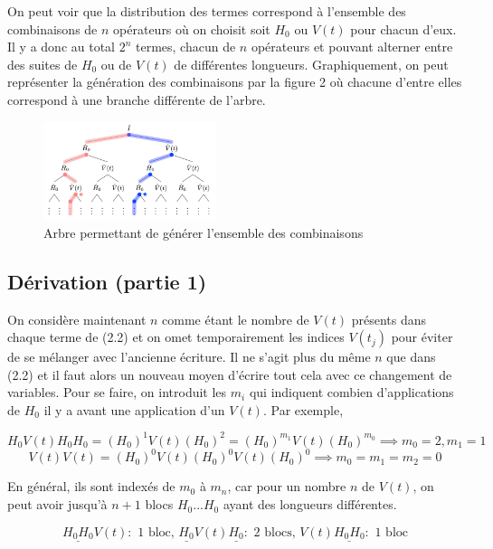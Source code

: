 On peut voir que la distribution des termes correspond à l'ensemble des combinaisons de $n$ opérateurs où on choisit soit $H_0$ ou $V(t)$ pour chacun d'eux. Il y a donc au total $2^n$ termes, chacun de $n$ opérateurs et pouvant alterner entre des suites de $H_0$ ou de $V(t)$ de différentes longueurs. Graphiquement, on peut représenter la génération des combinaisons par la figure 2 où chacune d'entre elles correspond à une branche différente de l'arbre.

\begin{figure}[H]
    \centering
     \includegraphics[width=0.45\textwidth]{images/ch2/embranchements.png}
    \caption{Arbre permettant de générer l'ensemble des combinaisons}
\end{figure}

\subsection{Dérivation (partie 1)}
On considère maintenant $n$ comme étant le nombre de $V(t)$ présents dans chaque terme de (2.2) et on omet temporairement les indices $V(t_j)$ pour éviter de se mélanger avec l'ancienne écriture. Il ne s'agit plus du même $n$ que dans (2.2) et il faut alors un nouveau moyen d'écrire tout cela avec ce changement de variables. Pour se faire, on introduit les $m_i$ qui indiquent combien d'applications de $H_0$ il y a avant une application d'un $V(t)$. Par exemple,

\begin{equation*}
    H_0V(t)H_0H_0 = (H_0)^1V(t)(H_0)^2 = (H_0)^{m_1}V(t)(H_0)^{m_0} \implies m_0 = 2, m_1 = 1
\end{equation*}
\begin{equation*}
    V(t)V(t) = (H_0)^0V(t)(H_0)^0V(t)(H_0)^0 \implies m_0 = m_1 = m_2 = 0
\end{equation*}

En général, ils sont indexés de $m_0$ à $m_n$, car pour un nombre $n$ de $V(t)$, on peut avoir jusqu'à $n+1$ blocs $H_0...H_0$ ayant des longueurs différentes.

\begin{equation*}
    \underline{H_0H_0}V(t) : \text{ 1 bloc, } \underline{H_0}V(t)\underline{H_0} : \text{ 2 blocs, } V(t)\underline{H_0H_0} : \text{ 1 bloc}
\end{equation*}




